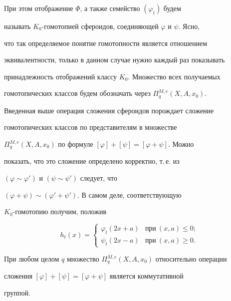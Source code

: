При этом отображение $\Phi$, а также семейство $(\varphi_t)$ будем 


называть $K_0$-гомотопией сфероидов, соединяющей $\varphi$ и $\psi$. Ясно, 


что так определяемое понятие гомотопности является отношением 


эквивалентности, только в данном случае нужно каждый раз показывать 


принадлежность отображений классу $K_0$. Множество всех получаемых 


гомотопических классов будем обозначать через $\Pi^{M,e}_q(X,A,x_0)$. 


Введенная выше операция сложения сфероидов порождает сложение 


гомотопических классов по представителям в множестве 


$\Pi^{M,e}_q(X,A,x_0)$ по формуле $[\varphi]+[\psi]=[\varphi+\psi]$. Можно 


показать, что это сложение определено корректно, т.\,е. из 


$(\varphi\sim\varphi')$ и $(\psi\sim\psi')$ следует, что 


$(\varphi+\psi)\sim(\varphi'+\psi')$. В самом деле, соответствующую 


$K_0$-гомотопию получим, положив 


$$ 


h_t(x)= 


\begin{cases} 


\varphi_t(2x+a)&\text{при}\ (x,a)\le0; \\ 


\psi_t(2x-a)&\text{при}\ (x,a)\ge0. 


\end{cases} 


$$ 


 


\begin{thm} 


При любом целом $q$ множество $\Pi^{M,e}_q(X,A,x_0)$ относительно операции 


сложения $[\varphi]+[\psi]=[\varphi+\psi]$ является коммутативной


группой. 


\end{thm} 


 


